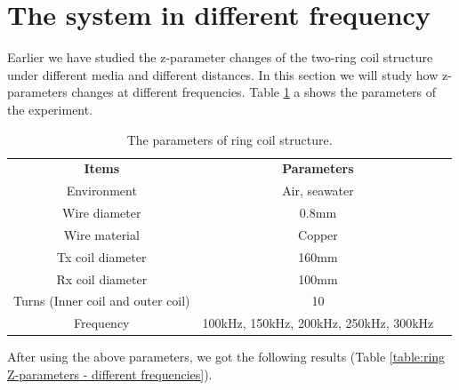 \section{The system in different frequency}
Earlier we have studied the z-parameter changes of the two-ring coil structure under different media and different distances. In this section we will study how z-parameters changes at different frequencies. Table \ref{table:ring coil parameters - different frequencies} a shows the parameters of the experiment.

\begin{table}[!t]
    \centering
    \caption{The parameters of ring coil structure.}
    \begin{tabular}{ c|cc }
        \thickhline
        \textbf{Items}                    & \textbf{Parameters}                    \\
        \thickhline
        Environment                       & Air, seawater                          \\ \hline
        Wire diameter                     & 0.8mm                                  \\ \hline
        Wire material                     & Copper                                 \\
        \hline
        Tx coil diameter                  & 160mm                                  \\ \hline
        Rx coil diameter                  & 100mm                                  \\ \hline
        Turns (Inner coil and outer coil) & 10                                     \\ \hline
        Frequency                         & 100kHz, 150kHz, 200kHz, 250kHz, 300kHz \\ \hline
    \end{tabular}
    \label{table:ring coil parameters - different frequencies}
\end{table}

After using the above parameters, we got the following results (Table \ref{table:ring Z-parameters - different frequencies}).

